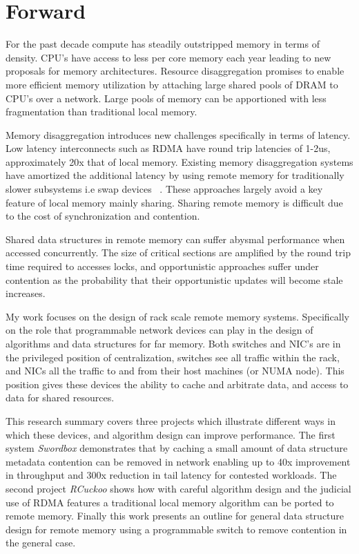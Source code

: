 
\section{Forward}

For the past decade compute has steadily outstripped memory
in terms of density. CPU's have access to less per core
memory each year leading to new proposals for memory
architectures. Resource disaggregation promises to enable
more efficient memory utilization by attaching large shared
pools of DRAM to CPU's over a network. Large pools of memory
can be apportioned with less fragmentation than traditional
local memory.

Memory disaggregation introduces new challenges specifically
in terms of latency. Low latency interconnects such as RDMA
have round trip latencies of 1-2us, approximately 20x that
of local memory. Existing memory disaggregation systems have
amortized the additional latency by using remote memory for
traditionally slower subsystems i.e swap devices
~\cite{fastswap, legoos}. These approaches largely avoid a
key feature of local memory mainly sharing. Sharing remote
memory is difficult due to the cost of synchronization and
contention.

Shared data structures in remote memory can suffer abysmal
performance when accessed concurrently. The size of critical
sections are amplified by the round trip time required to
accesses locks, and opportunistic approaches suffer under
contention as the probability that their opportunistic
updates will become stale increases.

My work focuses on the design of rack scale remote memory
systems. Specifically on the role that programmable network
devices can play in the design of algorithms and data
structures for far memory. Both switches and NIC's are in
the privileged position of centralization, switches see all
traffic within the rack, and NICs all the traffic to and
from their host machines (or NUMA node). This position gives
these devices the ability to cache and arbitrate data, and
access to data for shared resources. 

This research summary covers three projects which illustrate
different ways in which these devices, and algorithm design
can improve performance. The first system \textit{Swordbox}
demonstrates that by caching a small amount of data
structure metadata contention can be removed in network
enabling up to 40x improvement in throughput and 300x
reduction in tail latency for contested workloads. The
second project \textit{RCuckoo} shows how with careful
algorithm design and the judicial use of RDMA features a
traditional local memory algorithm can be ported to remote
memory. Finally this work presents an outline for general
data structure design for remote memory using a programmable
switch to remove contention in the general case.


